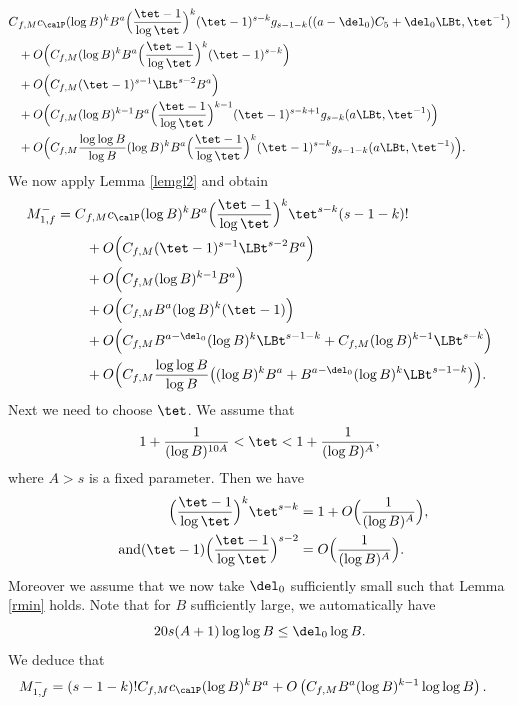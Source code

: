 \begin{equation*}
\begin{split}
C&_{f,M}c_{\calP} (\log B)^kB^{a} \Bigl(\frac{\tet -1}{\log \tet}\Bigr)^k (\tet-1)^{s-k} g_{s-1-k}((a-\del_0) C_5 + \del_0 \LBt, \tet^{-1}) \\
&+O\Bigl(C_{f,M} (\log B)^kB^{a} \Bigl(\frac{\tet -1}{\log \tet}\Bigr)^k (\tet-1)^{s-k}\Bigr)\\
&+O\Bigl(C_{f,M} (\tet -1)^{s-1} \LBt^{s-2} B^{a} \Bigr)\\
&+O\Bigl(C_{f,M} (\log B)^{k-1} B^{a} \Bigl(\frac{\tet -1}{\log \tet}\Bigr)^{k-1}(\tet-1)^{s-k+1} g_{s-k}(a \LBt, \tet^{-1}) \Bigr)\\
&+O\Bigl(C_{f,M}\frac{\log \log B}{\log B} (\log B)^kB^{a} \Bigl(\frac{\tet -1}{\log \tet}\Bigr)^k (\tet-1)^{s-k} g_{s-1-k}(a\LBt, \tet^{-1})\Bigr).
\end{split}
\end{equation*}
We now apply Lemma \ref{lemgl2} and obtain
\begin{equation*}
\begin{split}
M_{1,f}^- = C&_{f,M}c_{\calP} (\log B)^kB^{a} \Bigl(\frac{\tet -1}{\log \tet}\Bigr)^k \tet^{s-k} (s-1-k)!\\
&+O\Bigl(C_{f,M} (\tet -1)^{s-1} \LBt^{s-2} B^{a} \Bigr)\\
&+O\Bigl(C_{f,M} (\log B)^{k-1} B^{a} \Bigr)\\
&+O\Bigl(C_{f,M} B^{a} (\log B)^k (\tet-1)\Bigr)\\
&+ O\Bigl(C_{f,M} B^{a-\del_0}(\log B)^k \LBt^{s-1-k} + C_{f,M} (\log B)^{k-1} \LBt^{s-k} \Bigr)\\
&+O\Bigl(C_{f,M} \frac{\log\log B}{\log B}\bigl((\log B)^kB^{a}+ B^{a-\del_0}(\log B)^k \LBt^{s-1-k} \bigr) \Bigr).
\end{split}
\end{equation*}
Next we need to choose $\tet$. We assume that
\begin{equation}\label{eqn80b}
1+\frac{1}{(\log B)^{10A}}<\tet< 1+\frac{1}{(\log B)^A},
\end{equation}
where $A>s$ is a fixed parameter. Then we have
\begin{align*}
\Bigl(\frac{\tet -1}{\log \tet}\Bigr)^k \tet^{s-k}&= 1+O\Bigl(\frac{1}{(\log B)^A}\Bigr),
\\
\tag*{and}
(\tet-1) \Bigl(\frac{\tet -1}{\log \tet}\Bigr)^{s-2} &= O\Bigl(\frac{1}{(\log B)^A}\Bigr).
\end{align*}
Moreover we assume that we now take $\del_0$ sufficiently small such that Lemma \ref{rmin} holds. Note that for $B$ sufficiently large, we automatically have
\[
20s (A+1) \log \log B\leq \del_0 \log B.
\]
We deduce that
\begin{equation*}
\begin{split}
M_{1,f}^- &= (s-1-k)! C_{f,M}c_{\calP} (\log B)^kB^{a} +O\left(C_{f,M} B^{a} (\log B)^{k-1} \log \log B \right).
\end{split}
\end{equation*}

